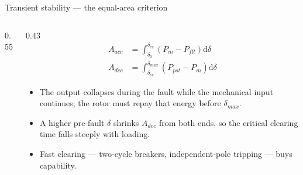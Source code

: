 \begin{frame}{Transient stability --- the equal-area criterion}
  \begin{columns}[c,onlytextwidth]
    \begin{column}{0.55\textwidth}\centering
    \end{column}
    \begin{column}{0.43\textwidth}
      \setlength{\abovedisplayskip}{2pt}\setlength{\belowdisplayskip}{2pt}
      \[ \begin{aligned}
           A_{acc} &= \int_{\delta_0}^{\delta_{cc}}\left(P_m-P_{flt}\right)\mathrm{d}\delta \\
           A_{dec} &= \int_{\delta_{cc}}^{\delta_{max}}\left(P_{pst}-P_m\right)\mathrm{d}\delta
         \end{aligned} \]
      {\footnotesize
      \begin{itemize}
        \setlength{\itemsep}{0.3em}
        \item The output collapses during the fault while the mechanical
              input continues; the rotor must repay that energy before
              $\delta_{max}$.
        \item A higher pre-fault $\delta$ shrinks $A_{dec}$ from both
              ends, so the critical clearing time falls steeply with
              loading.
        \item Fast clearing --- two-cycle breakers, independent-pole
              tripping --- buys capability.
      \end{itemize}}
    \end{column}
  \end{columns}
\end{frame}


